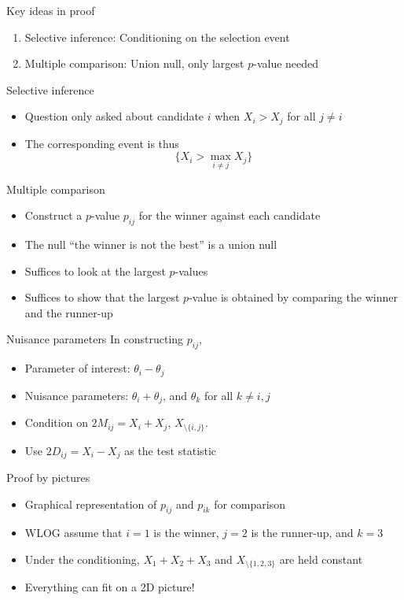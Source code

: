 \documentclass{beamer}
\begin{document}
\begin{frame}{Key ideas in proof}
\begin{enumerate}
\item Selective inference: Conditioning on the selection event \citep{Fithian:2014ws}
\item Multiple comparison: Union null, only largest $p$-value needed
\end{enumerate}
\end{frame}

\begin{frame}{Selective inference}
\begin{itemize}
\item Question only asked about candidate $i$ when $X_i > X_j$ for all $j \ne i$
\item The corresponding event is thus
\[
\{X_i > \max_{i \ne j} X_j\}
\]
\end{itemize}
\end{frame}

\begin{frame}{Multiple comparison}
\begin{itemize}
\item Construct a $p$-value $p_{ij}$ for the winner against each candidate
\item The null ``the winner is not the best'' is a union null
\item Suffices to look at the largest $p$-values
\item Suffices to show that the largest $p$-value is obtained by comparing the winner and the runner-up
\end{itemize}
\end{frame}

\begin{frame}{Nuisance parameters}
In constructing $p_{ij}$,
\begin{itemize}
\item Parameter of interest: $\theta_i - \theta_j$
\item Nuisance parameters: $\theta_i + \theta_j$, and $\theta_k$ for all $k \ne i, j$
\item Condition on $2M_{ij} = X_i + X_j$, $X_{\setminus\{i, j\}}$.
\item Use $2D_{ij} = X_i - X_j$ as the test statistic
\end{itemize}
\end{frame}

\begin{frame}{Proof by pictures}
\begin{itemize}
\item Graphical representation of $p_{ij}$ and $p_{ik}$ for comparison
\item WLOG assume that $i = 1$ is the winner, $j = 2$ is the runner-up, and $k = 3$
\item Under the conditioning, $X_1 + X_2 + X_3$ and $X_{\setminus\{1, 2, 3\}}$ are held constant
\item Everything can fit on a 2D picture!
\end{itemize}
\end{frame}
\end{document}
